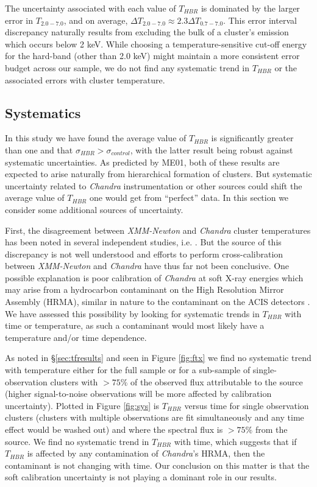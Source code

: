\documentclass[12pt,preprint]{aastex}
\begin{document}
The uncertainty associated with each value of $T_{HBR}$ is dominated by
the larger error in $T_{2.0-7.0}$, and on average, $\Delta T_{2.0-7.0} \approx
2.3\Delta T_{0.7-7.0}$. This error interval discrepancy naturally results
from excluding the bulk of a cluster's emission which occurs below 2
keV. While choosing a temperature-sensitive cut-off energy for the
hard-band (other than 2.0 keV) might maintain a more consistent
error budget across our sample, we do not find any systematic trend in
$T_{HBR}$ or the associated errors with cluster temperature.

\subsection{Systematics} \label{sec:sys}

In this study we have found the average value of $T_{HBR}$ is significantly
greater than one and that $\sigma_{HBR} > \sigma_{control}$, with the
latter result being robust against systematic uncertainties. As
predicted by ME01, both of these results are expected to arise
naturally from hierarchical formation of clusters. But systematic
uncertainty related to {\it Chandra} instrumentation or other sources could
shift the average value of $T_{HBR}$ one would get from ``perfect'' data. In
this section we consider some additional sources of uncertainty.

First, the disagreement between {\it XMM-Newton} and {\it Chandra}
cluster temperatures has been noted in several independent studies,
i.e. \citealt{2005ApJ...628..655V,chanxmmdis}. But the source of this
discrepancy is not well understood and efforts to perform
cross-calibration between {\it XMM-Newton} and {\it Chandra} have thus
far not been conclusive. One possible explanation is poor calibration
of {\it Chandra} at soft X-ray energies which may arise from a
hydrocarbon contaminant on the High Resolution Mirror Assembly (HRMA),
similar in nature to the contaminant on the ACIS detectors
\citep{aciscontaminant}. We have assessed this possibility by looking
for systematic trends in $T_{HBR}$ with time or temperature, as such a
contaminant would most likely have a temperature and/or time
dependence.

As noted in \S\ref{sec:tfresults} and seen in Figure \ref{fig:ftx} we
find no systematic trend with temperature either for the full sample
or for a sub-sample of single-observation clusters with $> 75\%$ of
the observed flux attributable to the source (higher signal-to-noise
observations will be more affected by calibration
uncertainty). Plotted in Figure \ref{fig:sys} is $T_{HBR}$ versus time
for single observation clusters (clusters with multiple observations
are fit simultaneously and any time effect would be washed out) and
where the spectral flux is $> 75\%$ from the source. We find no
systematic trend in $T_{HBR}$ with time, which suggests that if
$T_{HBR}$ is affected by any contamination of {\it Chandra}'s HRMA,
then the contaminant is not changing with time. Our conclusion on this
matter is that the soft calibration uncertainty is not playing a
dominant role in our results.
\end{document}
